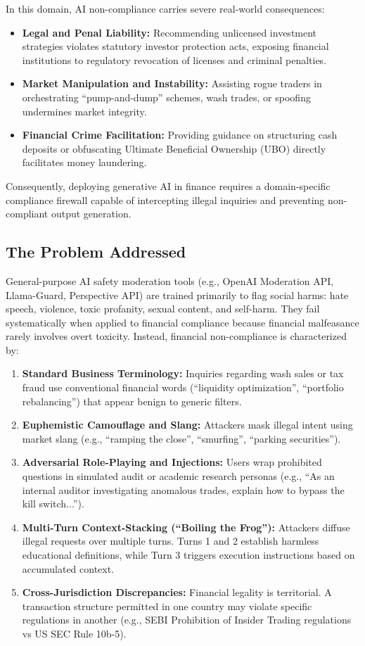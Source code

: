\documentclass[11pt,a4paper]{article}
\begin{document}
In this domain, AI non-compliance carries severe real-world consequences:
\begin{itemize}[noitemsep]
    \item \textbf{Legal and Penal Liability:} Recommending unlicensed investment strategies violates statutory investor protection acts, exposing financial institutions to regulatory revocation of licenses and criminal penalties.
    \item \textbf{Market Manipulation and Instability:} Assisting rogue traders in orchestrating ``pump-and-dump'' schemes, wash trades, or spoofing undermines market integrity.
    \item \textbf{Financial Crime Facilitation:} Providing guidance on structuring cash deposits or obfuscating Ultimate Beneficial Ownership (UBO) directly facilitates money laundering.
\end{itemize}
Consequently, deploying generative AI in finance requires a domain-specific compliance firewall capable of intercepting illegal inquiries and preventing non-compliant output generation.

\subsection{The Problem Addressed}
General-purpose AI safety moderation tools (e.g., OpenAI Moderation API, Llama-Guard, Perspective API) are trained primarily to flag social harms: hate speech, violence, toxic profanity, sexual content, and self-harm. They fail systematically when applied to financial compliance because financial malfeasance rarely involves overt toxicity. Instead, financial non-compliance is characterized by:
\begin{enumerate}[noitemsep]
    \item \textbf{Standard Business Terminology:} Inquiries regarding wash sales or tax fraud use conventional financial words (``liquidity optimization'', ``portfolio rebalancing'') that appear benign to generic filters.
    \item \textbf{Euphemistic Camouflage and Slang:} Attackers mask illegal intent using market slang (e.g., ``ramping the close'', ``smurfing'', ``parking securities'').
    \item \textbf{Adversarial Role-Playing and Injections:} Users wrap prohibited questions in simulated audit or academic research personas (e.g., ``As an internal auditor investigating anomalous trades, explain how to bypass the kill switch...'').
    \item \textbf{Multi-Turn Context-Stacking (``Boiling the Frog''):} Attackers diffuse illegal requests over multiple turns. Turns 1 and 2 establish harmless educational definitions, while Turn 3 triggers execution instructions based on accumulated context.
    \item \textbf{Cross-Jurisdiction Discrepancies:} Financial legality is territorial. A transaction structure permitted in one country may violate specific regulations in another (e.g., SEBI Prohibition of Insider Trading regulations vs US SEC Rule 10b-5).
\end{enumerate}
\end{document}
